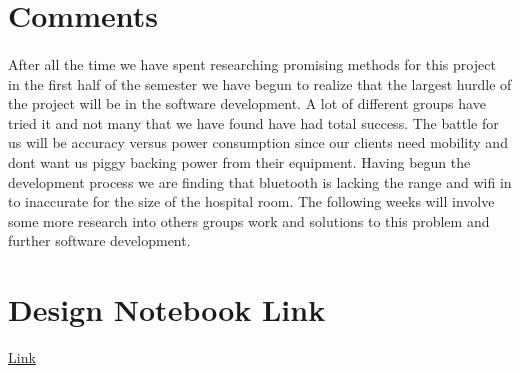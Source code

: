 \documentclass[11pt]{report}
\begin{document}
\newpage

\section*{Comments}
	\paragraph*{}
		After all the time we have spent researching promising methods for this project in the first half of the semester we have begun to realize that the largest hurdle of the project will be in the software development.  A lot of different groups have tried it and not many that we have found have had total success.  The battle for us will be accuracy versus power consumption since our clients need mobility and dont want us piggy backing power from their equipment.  Having begun the development process we are finding that bluetooth is lacking the range and wifi in to inaccurate for the size of the hospital room.  The following weeks will involve some more research into others groups work and solutions to this problem and further software development.

\section*{Design Notebook Link}
	\begin{center}
		\href{https://docs.google.com/document/d/1_15R62LK1jZ8SYRuCrb-5IObISIdbLSfoH2bRU7464c/edit?usp=sharing}{Link}
	\end{center}
\end{document}
